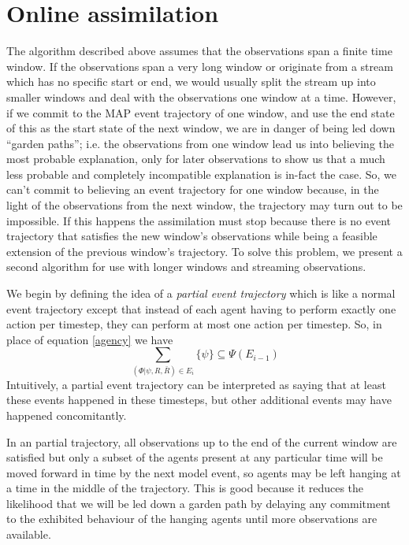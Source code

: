 \documentclass{article}
\begin{document}
\section{Online assimilation}

The algorithm described above assumes that the observations span a finite time window. If the observations span a very long window or originate from a stream which has no specific start or end, we would usually split the stream up into smaller windows and deal with the observations one window at a time. However, if we commit to the MAP event trajectory of one window, and use the end state of this as the start state of the next window, we are in danger of being led down ``garden paths''; i.e. the observations from one window lead us into believing the most probable explanation, only for later observations to show us that a much less probable and completely incompatible explanation is in-fact the case. So, we can't commit to believing an event trajectory for one window because, in the light of the observations from the next window, the trajectory may turn out to be impossible. If this happens the assimilation must stop because there is no event trajectory that satisfies the new window's observations while being a feasible extension of the previous window's trajectory. To solve this problem, we present a second algorithm for use with longer windows and streaming observations.

We begin by defining the idea of a \textit{partial event trajectory} which is like a normal event trajectory except that instead of each agent having to perform exactly one action per timestep, they can perform at most one action per timestep. So, in place of equation \ref{agency} we have
\begin{equation}
\sum_{(\Phi|\psi,R,\bar{R})\in E_i}\{\psi\} \subseteq \Psi(E_{i-1})
\label{partial}
\end{equation}
Intuitively, a partial event trajectory can be interpreted as saying that at least these events happened in these timesteps, but other additional events may have happened concomitantly.

In an partial trajectory, all observations up to the end of the current window are satisfied but only a subset of the agents present at any particular time will be moved forward in time by the next model event, so agents may be left hanging at a time in the middle of the trajectory. This is good because it reduces the likelihood that we will be led down a garden path by delaying any commitment to the exhibited behaviour of the hanging agents until more observations are available.
\end{document}
